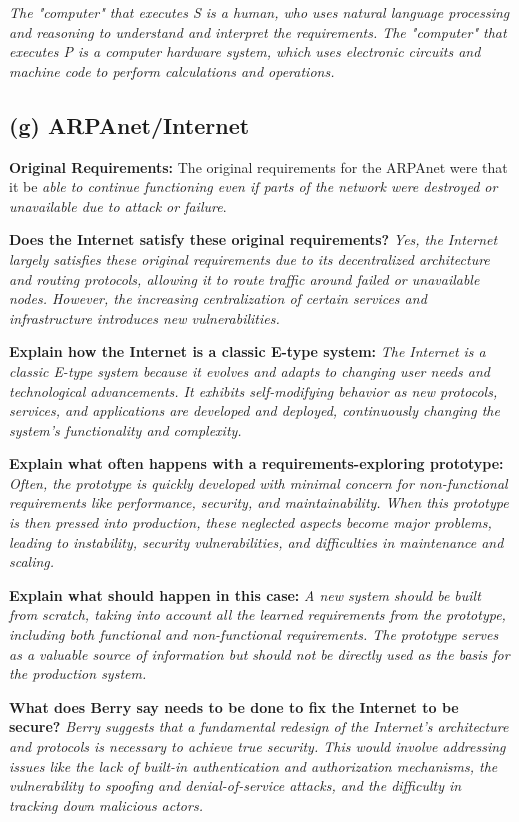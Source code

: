 \documentclass{article}
\begin{document}
\textit{The "computer" that executes S is a human, who uses natural language processing and reasoning to understand and interpret the requirements. The "computer" that executes P is a computer hardware system, which uses electronic circuits and machine code to perform calculations and operations.}

\subsection*{(g) ARPAnet/Internet}

\textbf{Original Requirements:} The original requirements for the ARPAnet were that it be \textit{able to continue functioning even if parts of the network were destroyed or unavailable due to attack or failure}.

\textbf{Does the Internet satisfy these original requirements?} \textit{Yes, the Internet largely satisfies these original requirements due to its decentralized architecture and routing protocols, allowing it to route traffic around failed or unavailable nodes. However, the increasing centralization of certain services and infrastructure introduces new vulnerabilities.}

\textbf{Explain how the Internet is a classic E-type system:} \textit{The Internet is a classic E-type system because it evolves and adapts to changing user needs and technological advancements. It exhibits self-modifying behavior as new protocols, services, and applications are developed and deployed, continuously changing the system's functionality and complexity.}

\textbf{Explain what often happens with a requirements-exploring prototype:} \textit{Often, the prototype is quickly developed with minimal concern for non-functional requirements like performance, security, and maintainability. When this prototype is then pressed into production, these neglected aspects become major problems, leading to instability, security vulnerabilities, and difficulties in maintenance and scaling.}

\textbf{Explain what should happen in this case:} \textit{A new system should be built from scratch, taking into account all the learned requirements from the prototype, including both functional and non-functional requirements. The prototype serves as a valuable source of information but should not be directly used as the basis for the production system.}

\textbf{What does Berry say needs to be done to fix the Internet to be secure?} \textit{Berry suggests that a fundamental redesign of the Internet's architecture and protocols is necessary to achieve true security. This would involve addressing issues like the lack of built-in authentication and authorization mechanisms, the vulnerability to spoofing and denial-of-service attacks, and the difficulty in tracking down malicious actors.}
\end{document}
